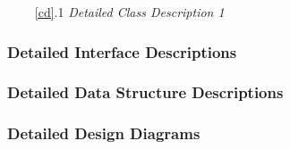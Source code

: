\documentclass{article}
\begin{document}
\begin{enumerate}
    \item[~\ref{cd}.1 ] \emph{Detailed Class Description 1}
\end{enumerate}

\subsubsection{Detailed Interface Descriptions}
\label{did}


\subsubsection{Detailed Data Structure Descriptions}
\label{ddsd}


\subsubsection{Detailed Design Diagrams}
\label{ddd}

\end{document}
